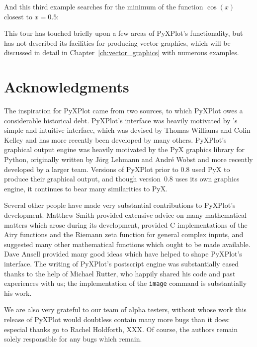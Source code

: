 \noindent And this third example searches for the minimum of the function $\cos(x)$ closest to $x=0.5$:

\vspace{3mm}
\newline
{}\newline
{}\newline
{}
\vspace{3mm}

This tour has touched briefly upon a few areas of PyXPlot's functionality, but
has not described its facilities for producing vector graphics, which will be
discussed in detail in Chapter~\ref{ch:vector_graphics} with numerous examples.

\section{Acknowledgments}

The inspiration for PyXPlot came from two sources, to which PyXPlot owes a
considerable historical debt.  PyXPlot's interface was heavily motivated by
\gnuplot's simple and intuitive interface, which was devised by Thomas Williams
and Colin Kelley and has more recently been developed by many others. PyXPlot's
graphical output engine was heavily motivated by the PyX graphics
library for Python, originally written by J\"org Lehmann and Andr\'e Wobst and
more recently developed by a larger team.  Versions of PyXPlot prior to $0.8$
used PyX to produce their graphical output, and though version~$0.8$ uses its
own graphics engine, it continues to bear many similarities to PyX.

Several other people have made very substantial contributions to PyXPlot's
development. Matthew Smith provided extensive advice on many mathematical
matters which arose during its development, provided C implementations of the
Airy functions and the Riemann zeta function for general complex inputs, and
suggested many other mathematical functions which ought to be made available.
Dave Ansell provided many good ideas which have helped to shape PyXPlot's
interface. The writing of PyXPlot's postscript engine was substantially eased
thanks to the help of Michael Rutter, who happily shared his code and past
experiences with us; the implementation of the {\tt image} command is
substantially his work.

We are also very grateful to our team of alpha testers, without whose work this
release of PyXPlot would doubtless contain many more bugs than it does:
especial thanks go to Rachel Holdforth, XXX. Of course, the authors remain
solely responsible for any bugs which remain.

